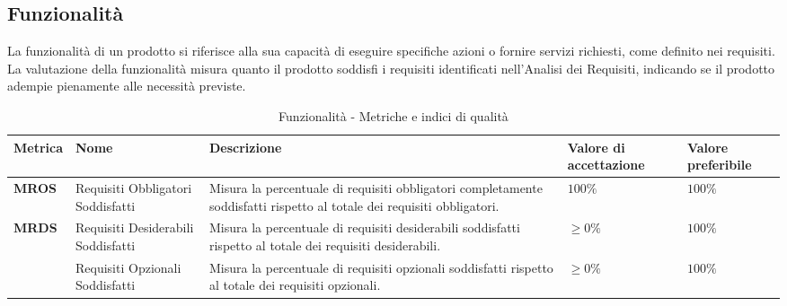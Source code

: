 \subsection{Funzionalità}
La funzionalità di un prodotto si riferisce alla sua capacità di eseguire specifiche azioni o fornire servizi richiesti, come definito nei requisiti. La valutazione della funzionalità misura quanto il prodotto soddisfi i requisiti identificati nell'Analisi dei Requisiti, indicando se il prodotto adempie pienamente alle necessità previste.  
\begin{table}[H]
    \centering
    \begin{tabular}{|C{1.5cm}|L{3cm}|L{4cm}|L{2.5cm}|L{2.5cm}|}
        \hline
        \textbf{Metrica} & \textbf{Nome} & \textbf{Descrizione} & \textbf{Valore di accettazione} & \textbf{Valore preferibile} \\
        \hline
        \textbf{MROS} & Requisiti Obbligatori Soddisfatti & Misura la percentuale di requisiti obbligatori completamente soddisfatti rispetto al totale dei requisiti obbligatori. & $100\%$ & $100\%$ \\
        \hline
        \textbf{MRDS} & Requisiti Desiderabili Soddisfatti & Misura la percentuale di requisiti desiderabili soddisfatti rispetto al totale dei requisiti desiderabili. & $\geq 0\%$ & $ 100\%$ \\
        \hline
        \textbf{} & Requisiti Opzionali Soddisfatti & Misura la percentuale di requisiti opzionali soddisfatti rispetto al totale dei requisiti opzionali. & $\geq 0\%$ & $ 100\%$ \\
        \hline
    \end{tabular}
    \caption{Funzionalità - Metriche e indici di qualità}
    \label{tab:funzionalità_qualita_prodotto}
\end{table}
